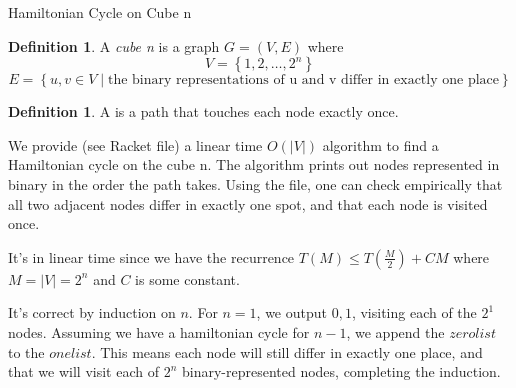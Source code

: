 \documentclass[11pt]{article}
\theoremstyle{definition}
\newtheorem{definition}[theorem]{Definition}
\def\setof#1{\left\{#1  \right\}}
\begin{document}
\begin{center}
{\Large 
Hamiltonian Cycle on Cube n}
\end{center}

\begin{definition}
A \textit{cube n} is a graph $G = (V,E)$ where
\[
V = \setof{1,2,\dots,2^n}
\]
\[
E = \setof{u,v \in V \mid \text{the binary representations of u and v differ in exactly one place}}
\]
\end{definition}

\begin{definition}
A  is a path that touches each node exactly once.
\end{definition}

We provide (see Racket file) a linear time $O(|V|)$ algorithm to find a Hamiltonian cycle on the cube n. The algorithm prints out nodes represented in binary in the order the path takes. Using the file, one can check empirically that all two adjacent nodes differ in exactly one spot, and that each node is visited once.

It's in linear time since we have the recurrence $T(M) \leq T(\frac{M}{2}) + CM$ where $M = |V| = 2^n$ and $C$ is some constant.

It's correct by induction on $n$. For $n = 1$, we output $0,1$, visiting each of the $2^1$ nodes. Assuming we have a hamiltonian cycle for $n-1$, we append the $zerolist$ to the $onelist$. This means each node will still differ in exactly one place, and that we will visit each of $2^n$ binary-represented nodes, completing the induction.
\end{document}
